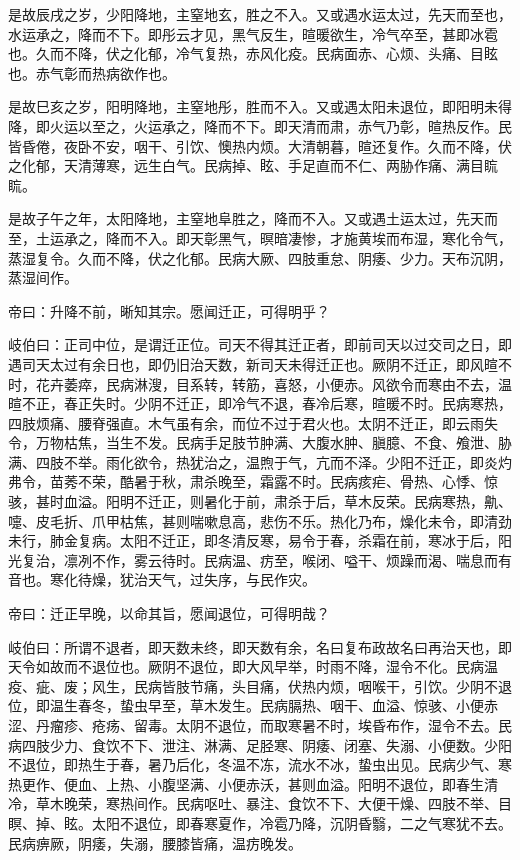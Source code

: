 \documentclass{article}%
\begin{document}
是故辰戌之岁，少阳降地，主窒地玄，胜之不入。又或遇水运太过，先天而至也，水运承之，降而不下。即彤云才见，黑气反生，暄暖欲生，冷气卒至，甚即冰雹也。久而不降，伏之化郁，冷气复热，赤风化疫。民病面赤、心烦、头痛、目眩也。赤气彰而热病欲作也。

是故巳亥之岁，阳明降地，主窒地彤，胜而不入。又或遇太阳未退位，即阳明未得降，即火运以至之，火运承之，降而不下。即天清而肃，赤气乃彰，暄热反作。民皆昏倦，夜卧不安，咽干、引饮、懊热内烦。大清朝暮，暄还复作。久而不降，伏之化郁，天清薄寒，远生白气。民病掉、眩、手足直而不仁、两胁作痛、满目䀮䀮。

是故子午之年，太阳降地，主窒地阜胜之，降而不入。又或遇土运太过，先天而至，土运承之，降而不入。即天彰黑气，暝暗凄惨，才施黄埃而布湿，寒化令气，蒸湿复令。久而不降，伏之化郁。民病大厥、四肢重怠、阴痿、少力。天布沉阴，蒸湿间作。

帝曰：升降不前，晰知其宗。愿闻迁正，可得明乎？

岐伯曰：正司中位，是谓迁正位。司天不得其迁正者，即前司天以过交司之日，即遇司天太过有余日也，即仍旧治天数，新司天未得迁正也。厥阴不迁正，即风暄不时，花卉萎瘁，民病淋溲，目系转，转筋，喜怒，小便赤。风欲令而寒由不去，温暄不正，春正失时。少阴不迁正，即冷气不退，春冷后寒，暄暖不时。民病寒热，四肢烦痛、腰脊强直。木气虽有余，而位不过于君火也。太阴不迁正，即云雨失令，万物枯焦，当生不发。民病手足肢节肿满、大腹水肿、䐜臆、不食、飧泄、胁满、四肢不举。雨化欲令，热犹治之，温煦于气，亢而不泽。少阳不迁正，即炎灼弗令，苗莠不荣，酷暑于秋，肃杀晚至，霜露不时。民病痎疟、骨热、心悸、惊骇，甚时血溢。阳明不迁正，则暑化于前，肃杀于后，草木反荣。民病寒热，鼽、嚏、皮毛折、爪甲枯焦，甚则喘嗽息高，悲伤不乐。热化乃布，燥化未令，即清劲未行，肺金复病。太阳不迁正，即冬清反寒，易令于春，杀霜在前，寒冰于后，阳光复治，凛冽不作，雾云待时。民病温、疠至，喉闭、嗌干、烦躁而渴、喘息而有音也。寒化待燥，犹治天气，过失序，与民作灾。

帝曰：迁正早晚，以命其旨，愿闻退位，可得明哉？

岐伯曰：所谓不退者，即天数未终，即天数有余，名曰复布政故名曰再治天也，即天令如故而不退位也。厥阴不退位，即大风早举，时雨不降，湿令不化。民病温疫、疵、废；风生，民病皆肢节痛，头目痛，伏热内烦，咽喉干，引饮。少阴不退位，即温生春冬，蛰虫早至，草木发生。民病膈热、咽干、血溢、惊骇、小便赤涩、丹瘤疹、疮疡、留毒。太阴不退位，而取寒暑不时，埃昏布作，湿令不去。民病四肢少力、食饮不下、泄注、淋满、足胫寒、阴痿、闭塞、失溺、小便数。少阳不退位，即热生于春，暑乃后化，冬温不冻，流水不冰，蛰虫出见。民病少气、寒热更作、便血、上热、小腹坚满、小便赤沃，甚则血溢。阳明不退位，即春生清冷，草木晚荣，寒热间作。民病呕吐、暴注、食饮不下、大便干燥、四肢不举、目瞑、掉、眩。太阳不退位，即春寒夏作，冷雹乃降，沉阴昏翳，二之气寒犹不去。民病痹厥，阴痿，失溺，腰膝皆痛，温疠晚发。
\end{document}
